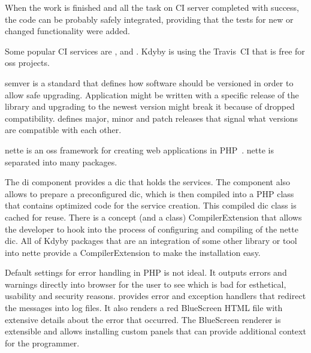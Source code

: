 When the work is finished and all the task on CI server completed with success, the code can be probably safely integrated, providing that the tests for new or changed functionality were added.

Some popular CI services are ,  and . Kdyby is using the Travis~CI that is free for \gls{oss} projects.

 \label{sec:theory:semver}

\gls{semver} is a standard that defines how software should be versioned in order to allow safe upgrading. Application might be written with a specific release of the library and upgrading to the newest version might break it because of dropped compatibility.  defines major, minor and patch releases that signal what versions are compatible with each other.

 \label{sec:theory:nette}

\gls{nette} is an \gls{oss} framework for creating web applications in PHP~\cite{wiki:nette}. \gls{nette} is separated into many packages.

The \gls{di} component  provides a \gls{dic} that holds the services. The component also allows to prepare a preconfigured \gls{dic}, which is then compiled into a PHP class that contains optimized code for the service creation. This compiled \gls{dic} class is cached for reuse. There is a concept (and a class) CompilerExtension that allows the developer to hook into the process of configuring and compiling of the \gls{nette} \gls{dic}. All of Kdyby packages that are an integration of some other library or tool into \gls{nette} provide a CompilerExtension to make the installation easy.

Default settings for error handling in PHP is not ideal. It outputs errors and warnings directly into browser for the user to see which is bad for esthetical, usability and security reasons.  provides error and exception handlers that redirect the messages into log files. It also renders a red BlueScreen HTML file with extensive details about the error that occurred. The BlueScreen renderer is extensible and allows installing custom panels that can provide additional context for the programmer.

